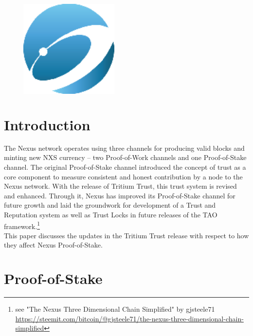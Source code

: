 \documentclass[11pt]{article}
\title{\rmfamily\normalfont{Nexus Proof-of-Stake with Tritium Trust}}
\author{Colin Cantrell\\
\and Scott Simon}
\date{September 28, 2019}
\begin{document}

\begin{figure}
    \centering
	\includegraphics[width=0.44\textwidth]{images/logo.png}
\end{figure}

\maketitle

\newpage
{}

\bigskip

\section{Introduction}
The Nexus network operates using three channels for producing valid blocks and minting new NXS currency -- two Proof-of-Work channels and one Proof-of-Stake channel. The original Proof-of-Stake channel introduced the concept of trust as a core component to measure consistent and honest contribution by a node to the Nexus network. With the release of Tritium Trust, this trust system is revised and enhanced. Through it, Nexus has improved its Proof-of-Stake channel for future growth and laid the groundwork for development of a Trust and Reputation system as well as Trust Locks in future releases of the TAO framework.\footnote{see "The Nexus Three Dimensional Chain Simplified" by gjsteele71\\ \url{https://steemit.com/bitcoin/@gjsteele71/the-nexus-three-dimensional-chain-simplified}} \\ 

\noindent This paper discusses the updates in the Tritium Trust release with respect to how they affect Nexus Proof-of-Stake.

\bigskip

\section{Proof-of-Stake}
\end{document}
